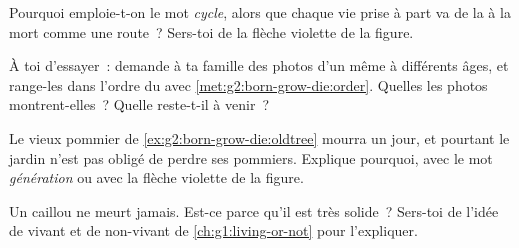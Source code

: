 \begin{exercise}[$\star$]\label{exo:g2:born-grow-die:7}
Pourquoi emploie-t-on le mot \emph{cycle}, alors que chaque vie
prise à part va de la  à la mort comme une route~? Sers-toi
de la flèche violette de la figure.
\end{exercise}

\begin{exercise}[$\star$]\label{exo:g2:born-grow-die:8}
À toi d'essayer~: demande à ta famille des photos d'un même  à
différents âges, et range-les dans l'ordre du  avec
\cref{met:g2:born-grow-die:order}. Quelles  les photos
montrent-elles~? Quelle  reste-t-il à venir~?
\end{exercise}

\begin{exercise}[$\star\star$]\label{exo:g2:born-grow-die:9}
Le vieux pommier de \cref{ex:g2:born-grow-die:oldtree} mourra un
jour, et pourtant le jardin n'est pas obligé de perdre ses pommiers.
Explique pourquoi, avec le mot \emph{génération} ou avec la flèche
violette de la figure.
\end{exercise}

\begin{exercise}[$\star\star$]\label{exo:g2:born-grow-die:10}
Un caillou ne meurt jamais. Est-ce parce qu'il est très solide~?
Sers-toi de l'idée de vivant et de non-vivant de
\cref{ch:g1:living-or-not} pour l'expliquer.
\end{exercise}

